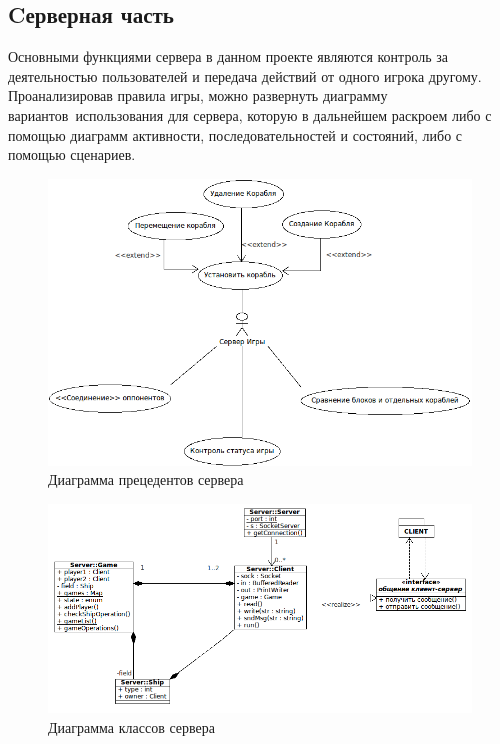 ﻿\subsection{Cерверная часть}

Основными функциями сервера в данном проекте являются контроль за деятельностью пользователей и передача действий от одного игрока другому. Проанализировав правила игры, можно развернуть диаграмму вариантов~использования для сервера, которую в дальнейшем раскроем либо с помощью диаграмм активности, последовательностей и состояний, либо с помощью сценариев.
  
\begin{figure}[htp]
\centering
\includegraphics[width=15cm]{images/useserver.png}
\caption{Диаграмма прецедентов сервера}
\label{fig14}
\end{figure}


\begin{figure}[htp]
\centering
\includegraphics[width=18cm]{images/class_server.png}
\caption{Диаграмма классов сервера}
\label{fig15}
\end{figure}

